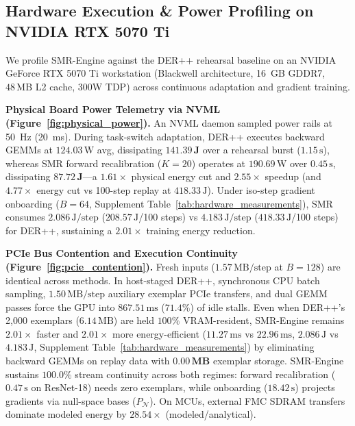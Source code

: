 \documentclass{article}
\begin{document}
\subsection{Hardware Execution \& Power Profiling on NVIDIA RTX 5070 Ti}
We profile SMR-Engine against the DER++ rehearsal baseline on an NVIDIA GeForce RTX 5070 Ti workstation (Blackwell architecture, 16~GB GDDR7, $48\,\text{MB}$ L2 cache, 300W TDP) across continuous adaptation and gradient training.

\noindent\textbf{Physical Board Power Telemetry via NVML (Figure~\ref{fig:physical_power}).} An NVML daemon sampled power rails at 50~Hz (20~ms). During task-switch adaptation, DER++ executes backward GEMMs at $124.03\,\text{W}$ avg, dissipating $\mathbf{141.39\,\text{J}}$ over a rehearsal burst ($1.15\,\text{s}$), whereas SMR forward recalibration ($K=20$) operates at $190.69\,\text{W}$ over $0.45\,\text{s}$, dissipating $\mathbf{87.72\,\text{J}}$---a $\mathbf{1.61\times}$ physical energy cut and $\mathbf{2.55\times}$ speedup (and $\mathbf{4.77\times}$ energy cut vs 100-step replay at $418.33\,\text{J}$). Under iso-step gradient onboarding ($B=64$, Supplement Table~\ref{tab:hardware_measurements}), SMR consumes $2.086\,\text{J/step}$ ($208.57\,\text{J}$/100 steps) vs $4.183\,\text{J/step}$ ($418.33\,\text{J}$/100 steps) for DER++, sustaining a $\mathbf{2.01\times}$ training energy reduction.

\noindent\textbf{PCIe Bus Contention and Execution Continuity (Figure~\ref{fig:pcie_contention}).} Fresh inputs ($1.57\,\text{MB/step}$ at $B=128$) are identical across methods. In host-staged DER++, synchronous CPU batch sampling, $1.50\,\text{MB/step}$ auxiliary exemplar PCIe transfers, and dual GEMM passes force the GPU into $867.51\,\text{ms}$ ($71.4\%$) of idle stalls. Even when DER++'s 2,000 exemplars ($6.14\,\text{MB}$) are held $100\%$ VRAM-resident, SMR-Engine remains $\mathbf{2.01\times}$ faster and $\mathbf{2.01\times}$ more energy-efficient ($11.27\,\text{ms}$ vs $22.96\,\text{ms}$, $2.086\,\text{J}$ vs $4.183\,\text{J}$, Supplement Table~\ref{tab:hardware_measurements}) by eliminating backward GEMMs on replay data with $\mathbf{0.00\,\text{MB}}$ exemplar storage. SMR-Engine sustains $\mathbf{100.0\%}$ stream continuity across both regimes: forward recalibration ($0.47\,\text{s}$ on ResNet-18) needs zero exemplars, while onboarding ($18.42\,\text{s}$) projects gradients via null-space bases ($P_{\mathcal{N}}$). On MCUs, external FMC SDRAM transfers dominate modeled energy by $28.54\times$ (modeled/analytical).
\end{document}

